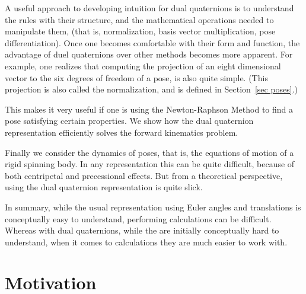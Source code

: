 \documentclass[reqno,12pt]{amsart}
\begin{document}
A useful approach to developing intuition for dual quaternions is to understand the rules with their structure, and the mathematical operations needed to manipulate them, (that is, normalization, basis vector multiplication, pose differentiation).  Once one becomes comfortable with their form and function, the advantage of duel quaternions over other methods becomes more apparent.  For example, one realizes that computing the projection of an eight dimensional vector to the six degrees of freedom of a pose, is also quite simple.  (This projection is also called the normalization, and is defined in Section~\ref{sec poses}.)

This makes it very useful if one is using the Newton-Raphson Method to find a pose satisfying certain properties.  We show how the dual quaternion representation efficiently solves the forward kinematics problem.

Finally we consider the dynamics of poses, that is, the equations of motion of a rigid spinning body.  In any representation this can be quite difficult, because of both centripetal and precessional effects.  But from a theoretical perspective, using the dual quaternion representation is quite slick.

In summary, while the usual representation using Euler angles and translations is conceptually easy to understand, performing calculations can be difficult.  Whereas with dual quaternions, while the are initially conceptually hard to understand, when it comes to calculations they are much easier to work with.

\section{Motivation}
\label{sec motivation}
\end{document}
